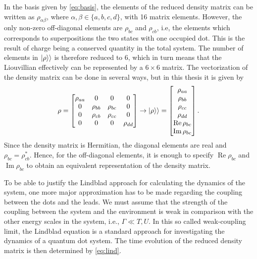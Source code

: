 \documentclass[../main.tex]{subfiles}
\begin{document}
In the basis given by \cref{eq:basis}, the elements of the reduced density matrix can be written as $\rho_{\alpha\beta}$, where $\alpha,\beta\in\{a,b,c,d\}$, with 16 matrix elements. However, the only non-zero off-diagonal elements are $\rho_{bc}$ and $\rho_{cb}$, i.e, the elements which corresponds to superpositions the two states with one occupied dot. This is the result of charge being a conserved quantity in the total system. The number of elements in $\ket{\rho}\rangle$ is therefore reduced to 6, which in turn means that the Liouvillian effectively can be represented by a $6\times6$ matrix. The vectorization of the density matrix can be done in several ways, but in this thesis it is given by
\begin{equation}\label{eq:order}
    \rho = \begin{bmatrix} \rho_{aa} & 0 & 0 & 0 \\
                    0 & \rho_{bb} & \rho_{bc} & 0 \\
                    0 & \rho_{cb} & \rho_{cc} & 0 \\
                    0 & 0 & 0 & \rho_{dd} \end{bmatrix} \rightarrow \ket{\rho}\rangle = \begin{bmatrix} \rho_{aa} \\ \rho_{bb} \\ \rho_{cc} \\ \rho_{dd} \\ \operatorname{Re}\rho_{bc} \\ \operatorname{Im}\rho_{bc}\end{bmatrix}.
\end{equation}
Since the density matrix is Hermitian, the diagonal elements are real and $\rho_{bc}=\rho_{cb}^*$. Hence, for the off-diagonal elements, it is enough to specify $\operatorname{Re}\rho_{bc}$ and $\operatorname{Im}\rho_{bc}$ to obtain an equivalent representation of the density matrix.

To be able to justify the Lindblad approach for calculating the dynamics of the system, one more major approximation has to be made regarding the coupling between the dots and the leads. We must assume that the strength of the coupling between the system and the environment is weak in comparison with the other energy scales in the system, i.e., $\Gamma \ll T, U$. In this so called weak-coupling limit, the Lindblad equation is a standard approach for investigating the dynamics of a quantum dot system. The time evolution of the reduced density matrix is then determined by \cref{eq:lind}.

\end{document}
